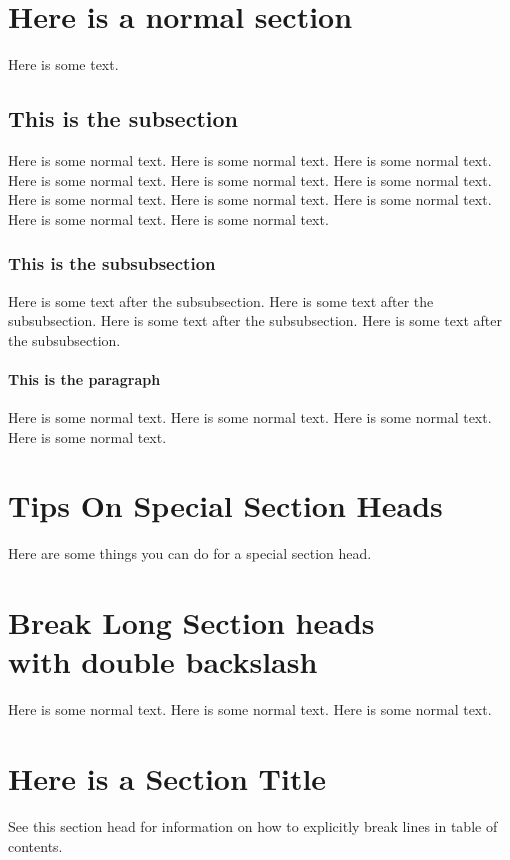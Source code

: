 \documentclass{wileySix}
\begin{document}
\section{Here is a normal section}
Here is some text.

\subsection{This is the subsection}
Here is some normal text.
Here is some normal text.
Here is some normal text.
Here is some normal text.
Here is some normal text.
Here is some normal text.
Here is some normal text.
Here is some normal text.
Here is some normal text.
Here is some normal text.
Here is some normal text.


\subsubsection{This is the subsubsection}
Here is some text after the subsubsection.
Here is some text after the subsubsection.
Here is some text after the subsubsection.
Here is some text after the subsubsection.

\paragraph{This is the paragraph}
Here is some normal text.
Here is some normal text.
Here is some normal text.
Here is some normal text.

\section{Tips On Special Section Heads}
Here are some things you can do for a special
section head.

\section[This Version of Section Head will be sent Contents]
{Break Long Section heads\\ with double backslash}
Here is some normal text.
Here is some normal text.
Here is some normal text.

 \section[This show how to explicitly break lines
\string\hfill\string\break\space in Table of Contents]
{Here is a Section Title}
See this section head for information on how to explicitly break lines in
table of contents.
\end{document}
